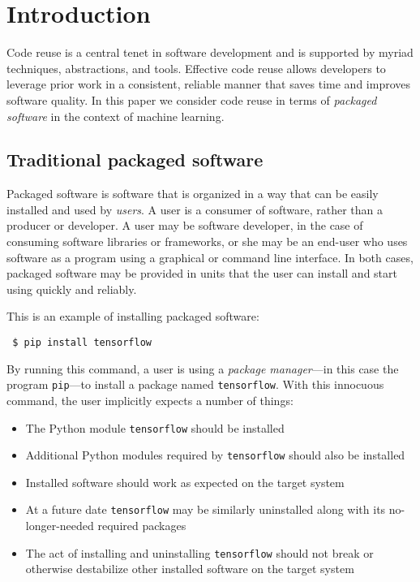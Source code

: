 \documentclass{article}
\begin{document}
\printAffiliationsAndNotice{}  %

\section{Introduction}

Code reuse is a central tenet in software development and is supported
by myriad techniques, abstractions, and tools. Effective code reuse
allows developers to leverage prior work in a consistent, reliable
manner that saves time and improves software quality. In this paper we
consider code reuse in terms of \emph{packaged software} in the
context of machine learning.

\subsection{Traditional packaged software}

Packaged software is software that is organized in a way that can be
easily installed and used by \emph{users}. A user is a consumer of
software, rather than a producer or developer. A user may be software
developer, in the case of consuming software libraries or frameworks,
or she may be an end-user who uses software as a program using a
graphical or command line interface. In both cases, packaged software
may be provided in units that the user can install and start using
quickly and reliably.

This is an example of installing packaged software:

{\footnotesize
\begin{verbatim}
 $ pip install tensorflow
\end{verbatim}}

By running this command, a user is using a \emph{package manager}---in
this case the program \verb|pip|---to install a package named
\verb|tensorflow|. With this innocuous command, the user implicitly expects
a number of things:

\begin{itemize}
\item The Python module \verb|tensorflow| should be installed
\item Additional Python modules required by \verb|tensorflow| should
  also be installed
\item Installed software should work as expected on the target system
\item At a future date \verb|tensorflow| may be similarly uninstalled along
  with its no-longer-needed required packages
\item The act of installing and uninstalling \verb|tensorflow| should
  not break or otherwise destabilize other installed software on the
  target system
\end{itemize}
\end{document}
